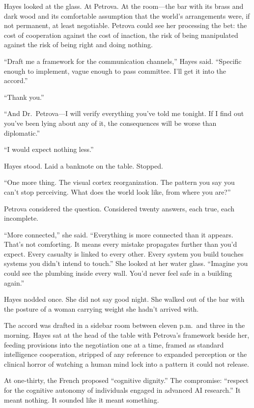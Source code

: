 Hayes looked at the glass. At Petrova. At the room---the bar with its brass and dark wood and its comfortable assumption that the world's arrangements were, if not permanent, at least negotiable. Petrova could see her processing the bet: the cost of cooperation against the cost of inaction, the risk of being manipulated against the risk of being right and doing nothing.

``Draft me a framework for the communication channels,'' Hayes said. ``Specific enough to implement, vague enough to pass committee. I'll get it into the accord.''

``Thank you.''

``And Dr.\ Petrova---I will verify everything you've told me tonight. If I find out you've been lying about any of it, the consequences will be worse than diplomatic.''

``I would expect nothing less.''

Hayes stood. Laid a banknote on the table. Stopped.

``One more thing. The visual cortex reorganization. The pattern you say you can't stop perceiving. What does the world look like, from where you are?''

Petrova considered the question. Considered twenty answers, each true, each incomplete.

``More connected,'' she said. ``Everything is more connected than it appears. That's not comforting. It means every mistake propagates further than you'd expect. Every casualty is linked to every other. Every system you build touches systems you didn't intend to touch.'' She looked at her water glass. ``Imagine you could see the plumbing inside every wall. You'd never feel safe in a building again.''

Hayes nodded once. She did not say good night. She walked out of the bar with the posture of a woman carrying weight she hadn't arrived with.

\scenebreak

The accord was drafted in a sidebar room between eleven p.m.\ and three in the morning. Hayes sat at the head of the table with Petrova's framework beside her, feeding provisions into the negotiation one at a time, framed as standard intelligence cooperation, stripped of any reference to expanded perception or the clinical horror of watching a human mind lock into a pattern it could not release.

At one-thirty, the French proposed ``cognitive dignity.'' The compromise: ``respect for the cognitive autonomy of individuals engaged in advanced AI research.'' It meant nothing. It sounded like it meant something.

